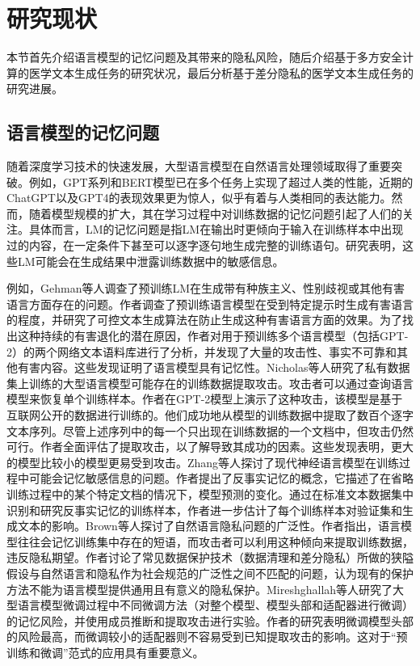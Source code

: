 \section{研究现状}

本节首先介绍语言模型的记忆问题及其带来的隐私风险，随后介绍基于多方安全计算的医学文本生成任务的研究状况，最后分析基于差分隐私的医学文本生成任务的研究进展。

\subsection{语言模型的记忆问题}

随着深度学习技术的快速发展，大型语言模型在自然语言处理领域取得了重要突破。例如，GPT\cite{GPT2, GPT3, GPT4}系列和BERT\cite{BERT}模型已在多个任务上实现了超过人类的性能，近期的ChatGPT以及GPT4\cite{GPT4}的表现效果更为惊人，似乎有着与人类相同的表达能力。然而，随着模型规模的扩大，其在学习过程中对训练数据的记忆问题引起了人们的关注。具体而言，LM的记忆问题是指LM在输出时更倾向于输入在训练样本中出现过的内容，在一定条件下甚至可以逐字逐句地生成完整的训练语句。研究表明，这些LM可能会在生成结果中泄露训练数据中的敏感信息。

例如，Gehman等人\cite{RealToxicityPrompts}调查了预训练LM在生成带有种族主义、性别歧视或其他有害语言方面存在的问题。作者调查了预训练语言模型在受到特定提示时生成有害语言的程度，并研究了可控文本生成算法在防止生成这种有害语言方面的效果。为了找出这种持续的有害退化的潜在原因，作者对用于预训练多个语言模型（包括GPT-2）的两个网络文本语料库进行了分析，并发现了大量的攻击性、事实不可靠和其他有害内容。这些发现证明了语言模型具有记忆性。Nicholas等人\cite{Extrac_Train_Data_From_LM}研究了私有数据集上训练的大型语言模型可能存在的训练数据提取攻击。攻击者可以通过查询语言模型来恢复单个训练样本。作者在GPT-2模型上演示了这种攻击，该模型是基于互联网公开的数据进行训练的。他们成功地从模型的训练数据中提取了数百个逐字文本序列。尽管上述序列中的每一个只出现在训练数据的一个文档中，但攻击仍然可行。作者全面评估了提取攻击，以了解导致其成功的因素。这些发现表明，更大的模型比较小的模型更易受到攻击。Zhang等人\cite{Counterfactual}探讨了现代神经语言模型在训练过程中可能会记忆敏感信息的问题。作者提出了反事实记忆的概念，它描述了在省略训练过程中的某个特定文档的情况下，模型预测的变化。通过在标准文本数据集中识别和研究反事实记忆的训练样本，作者进一步估计了每个训练样本对验证集和生成文本的影响。Brown等人\cite{LMPPMean}探讨了自然语言隐私问题的广泛性。作者指出，语言模型往往会记忆训练集中存在的短语，而攻击者可以利用这种倾向来提取训练数据，违反隐私期望。作者讨论了常见数据保护技术（数据清理和差分隐私）所做的狭隘假设与自然语言和隐私作为社会规范的广泛性之间不匹配的问题，认为现有的保护方法不能为语言模型提供通用且有意义的隐私保护。Mireshghallah等人\cite{mireshghallah2022memorization}研究了大型语言模型微调过程中不同微调方法（对整个模型、模型头部和适配器进行微调）的记忆风险，并使用成员推断和提取攻击进行实验。作者的研究表明微调模型头部的风险最高，而微调较小的适配器则不容易受到已知提取攻击的影响。这对于“预训练和微调”范式的应用具有重要意义。

